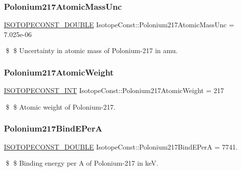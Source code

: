 \subsubsection{\texorpdfstring{Polonium217\+Atomic\+Mass\+Unc}{Polonium217AtomicMassUnc}}
{\footnotesize\ttfamily \mbox{\hyperlink{group___isotope_const-_macros_ga8f45a7272ce02c0b4c65c44636ed719a}{I\+S\+O\+T\+O\+P\+E\+C\+O\+N\+S\+T\+\_\+\+D\+O\+U\+B\+LE}} Isotope\+Const\+::\+Polonium217\+Atomic\+Mass\+Unc = 7.\+025e-\/06}

\$ \$ Uncertainty in atomic mass of Polonium-\/217 in amu. \mbox{\label{group___isotope_const-_polonium-_po217_ga81925bd1859bf3389a88f0e1e55443ed}} 
\subsubsection{\texorpdfstring{Polonium217\+Atomic\+Weight}{Polonium217AtomicWeight}}
{\footnotesize\ttfamily \mbox{\hyperlink{group___isotope_const-_macros_ga5f18360b3e99483a35c32d789e62621c}{I\+S\+O\+T\+O\+P\+E\+C\+O\+N\+S\+T\+\_\+\+I\+NT}} Isotope\+Const\+::\+Polonium217\+Atomic\+Weight = 217}

\$ \$ Atomic weight of Polonium-\/217. \mbox{\label{group___isotope_const-_polonium-_po217_gab2fff05deb17d6f067f0ec5b2e23594b}} 
\subsubsection{\texorpdfstring{Polonium217\+Bind\+E\+PerA}{Polonium217BindEPerA}}
{\footnotesize\ttfamily \mbox{\hyperlink{group___isotope_const-_macros_ga8f45a7272ce02c0b4c65c44636ed719a}{I\+S\+O\+T\+O\+P\+E\+C\+O\+N\+S\+T\+\_\+\+D\+O\+U\+B\+LE}} Isotope\+Const\+::\+Polonium217\+Bind\+E\+PerA = 7741.}

\$ \$ Binding energy per A of Polonium-\/217 in keV. \mbox{\label{group___isotope_const-_polonium-_po217_ga703737d21cbd6f7cd1d70714bfbf2b78}} 

